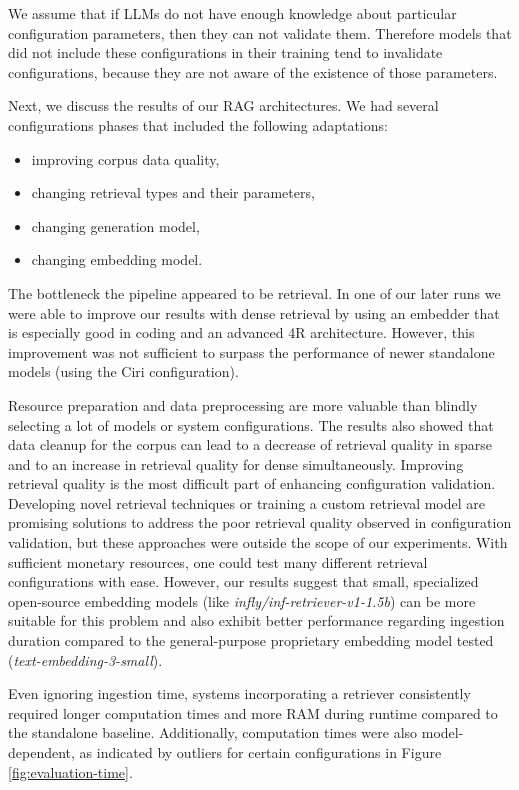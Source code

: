 We assume that if LLMs do not have enough knowledge about particular configuration parameters, then they can not validate them. Therefore models that did not include these configurations in their training tend to invalidate configurations, because they are not aware of the existence of those parameters.

Next, we discuss the results of our RAG architectures. We had several configurations phases that included the following adaptations:
\begin{itemize}
    \item improving corpus data quality,
    \item changing retrieval types and their parameters,
    \item changing generation model,
    \item changing embedding model.
\end{itemize}

The bottleneck the pipeline appeared to be retrieval. In one of our later runs we were able to improve our results with dense retrieval by using an embedder that is especially good in coding and an advanced 4R architecture. However, this improvement was not sufficient to surpass the performance of newer standalone models (using the Ciri configuration). 

Resource preparation and data preprocessing are more valuable than blindly selecting a lot of models or system configurations. The results also showed that data cleanup for the corpus can lead to a decrease of retrieval quality in sparse and to an increase in retrieval quality for dense simultaneously. Improving retrieval quality is the most difficult part of enhancing configuration validation. Developing novel retrieval techniques or training a custom retrieval model are promising solutions to address the poor retrieval quality observed in configuration validation, but these approaches were outside the scope of our experiments. With sufficient monetary resources, one could test many different retrieval configurations with ease. However, our results suggest that small, specialized open-source embedding models (like \textit{infly/inf-retriever-v1-1.5b}) can be more suitable for this problem and also exhibit better performance regarding ingestion duration compared to the general-purpose proprietary embedding model tested (\textit{text-embedding-3-small}).

Even ignoring ingestion time, systems incorporating a retriever consistently required longer computation times and more RAM during runtime compared to the standalone baseline. Additionally, computation times were also model-dependent, as indicated by outliers for certain configurations in Figure \ref{fig:evaluation-time}.

